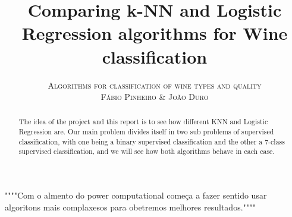 \documentclass[twoside]{article}
\title{\vspace{-15mm}\fontsize{24pt}{10pt}\selectfont\textbf{Comparing k-NN and Logistic Regression algorithms for Wine classification}}
\author{
\large
\textsc{Algorithms for classification of wine types and quality}\\[2mm]
\textsc{F\'{a}bio Pinheiro  \& Jo\~{a}o Duro}\\[2mm]
\vspace{-5mm}
}
\date{}
\begin{document}
\maketitle %


\begin{abstract}
The idea of the project and this report is to see how different KNN and Logistic Regression are. Our main problem divides itself in two sub problems of supervised classification, with one being a binary supervised classification and the other a 7-class supervised classification, and we will see how both algorithms behave in each case.


\end{abstract}
""""Com o almento do power computational começa a fazer sentido usar algoritons mais complaxesos para obetremos melhores resultados.""""

\end{document}

